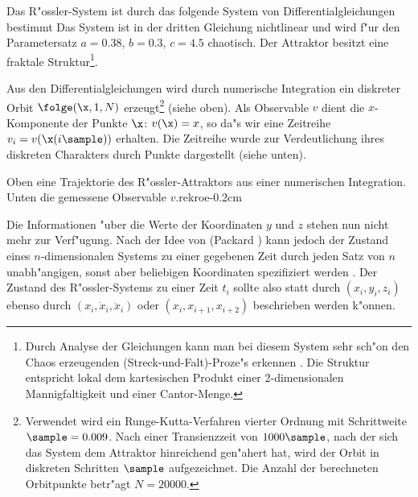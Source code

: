 Das R"ossler-System \cite{Roessler76} ist durch das folgende System von
Differentialgleichungen bestimmt
Das System ist in der dritten Gleichung nichtlinear und wird f"ur den Parametersatz
$a=0.38$, $b=0.3$, $c=4.5$ chaotisch. Der Attraktor besitzt eine fraktale
Struktur\footnote{Durch Analyse der Gleichungen kann man bei diesem System sehr sch"on den Chaos
  erzeugenden \metapher(Streck-und-Falt)-Proze"s erkennen \cite{Peitgen92}.  Die Struktur
  entspricht lokal dem kartesischen Produkt einer 2-dimensionalen Mannigfaltigkeit und einer
  Cantor-Menge.}.

Aus den Differentialgleichungen wird durch numerische Integration ein diskreter
Orbit $\folge(\x,1,N)$ erzeugt\footnote{Verwendet wird ein Runge-Kutta-Verfahren vierter Ordnung mit
  Schrittweite $\sample=0.009$. Nach einer Transienzzeit von $1000\sample$, nach der sich
  das System dem Attraktor hinreichend gen"ahert hat, wird der Orbit in diskreten
  Schritten $\sample$ aufgezeichnet.  Die Anzahl der berechneten Orbitpunkte betr"agt
  $N=20000$.}
 (siehe  oben).  Als Observable $v$ dient die $x$-Komponente der
Punkte $\x$: $v(\x)=x$, so da"s wir eine Zeitreihe $v_i = v(\x(i\sample))$ erhalten. 
Die Zeitreihe wurde zur Verdeutlichung ihres diskreten Charakters durch Punkte
dargestellt (siehe  unten).  



{Oben eine Trajektorie des R"ossler-Attraktors aus einer numerischen
Integration. Unten die gemessene Observable $v$.}{rekroe}{-0.2cm}

Die Informationen "uber die Werte der Koordinaten $y$ und $z$ stehen nun nicht mehr zur
Verf"u\-gung. Nach der Idee von \autor(Packard \etal) kann jedoch der Zustand eines
$n$-dimensio\-na\-len Systems zu einer gegebenen Zeit durch jeden Satz von $n$
unabh"angigen, sonst aber beliebigen Koordinaten spezifiziert werden \cite{Packard80}.
Der Zustand des R"ossler-Systems zu einer Zeit $t_i$ sollte also statt durch
$(x_i,y_i,z_i)$ ebenso durch $(x_i,\dot x_i,\ddot x_i)$ oder $(x_i,x_{i+1},x_{i+2})$
beschrieben werden k"onnen.

